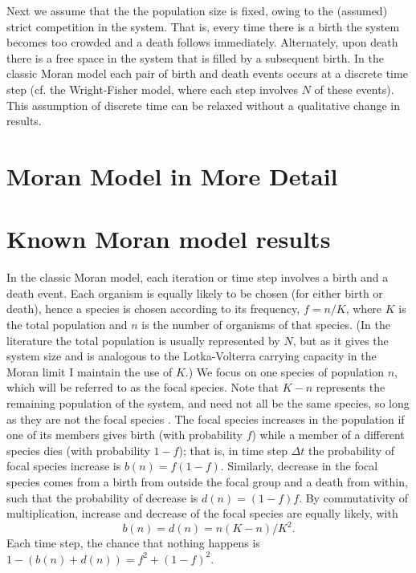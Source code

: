 Next we assume that the the population size is fixed, owing to the (assumed) strict competition in the system.
That is, every time there is a birth the system becomes too crowded and a death follows immediately. Alternately, upon death there is a free space in the system that is filled by a subsequent birth.
In the classic Moran model each pair of birth and death events occurs at a discrete time step (cf. the Wright-Fisher model, where each step involves $N$ of these events). 
This assumption of discrete time can be relaxed without a qualitative change in results. 


\section{Moran Model in More Detail}
\fi
\section{Known Moran model results}
In the classic Moran model, each iteration or time step involves a birth and a death event.
Each organism is equally likely to be chosen (for either birth or death), hence a species is chosen according to its frequency, $f=n/K$, where $K$ is the total population and $n$ is the number of organisms of that species. 
(In the literature the total population is usually represented by $N$, but as it gives the system size and is analogous to the Lotka-Volterra carrying capacity in the Moran limit I maintain the use of $K$.) 
We focus on one species of population $n$, which will be referred to as the focal species. 
Note that $K-n$ represents the remaining population of the system, and need not all be the same species, so long as they are not the focal species \cite{Black2012}. %
The focal species increases in the population if one of its members gives birth (with probability $f$) while a member of a different species dies (with probability $1-f$); that is, in time step $\Delta t$ the probability of focal species increase is $b(n) = f(1-f)$. 
Similarly, decrease in the focal species comes from a birth from outside the focal group and a death from within, such that the probability of decrease is $d(n) = (1-f)f$. 
By commutativity of multiplication, increase and decrease of the focal species are equally likely, with
\begin{equation}
b(n) = d(n) = n(K-n)/K^2.
\end{equation}
Each time step, the chance that nothing happens is $1-\left(b(n)+d(n)\right) = f^2 + (1-f)^2$. 

